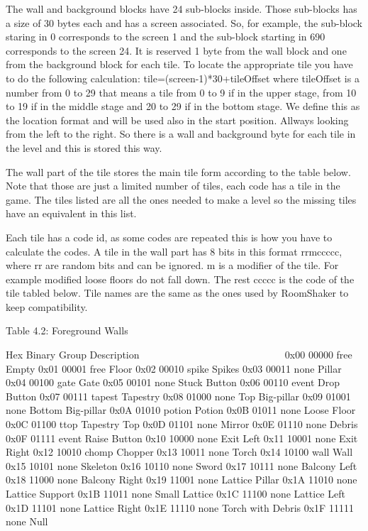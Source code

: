  The wall and background blocks have 24 sub-blocks inside. Those sub-blocks
 has a size of 30 bytes each and has a screen associated. So, for example,
 the sub-block staring in 0 corresponds to the screen 1 and the sub-block
 starting in 690 corresponds to the screen 24.
 It is reserved 1 byte from the wall block and one from the background
 block for each tile. To locate the appropriate tile you have to do the
 following calculation: tile=(screen-1)*30+tileOffset where tileOffset is a
 number
 from 0 to 29 that means a tile from 0 to 9 if in the upper stage, from
 10 to 19 if in the middle stage and 20 to 29 if in the bottom stage.
 We define this as the location format and will be used also in the start
 position.
 Allways looking from the left to the right.
 So there is a wall and background byte for each tile in the level and this
 is stored this way.

 The wall part of the tile stores the main tile form according to the table
 below. Note that those are just a limited number of tiles, each code has a
 tile in the game. The tiles listed are all the ones needed to make a level
 so the missing tiles have an equivalent in this list.

 Each tile has a code id, as some codes are repeated this is how you have
 to calculate the codes. A tile in the wall part has 8 bits in this format
 rrmccccc, where rr are random bits and can be ignored. m is a modifier of
 the tile. For example modified loose floors do not fall down. The rest
 ccccc is the code of the tile tabled below. Tile names are the same as the
 ones used by RoomShaker to keep compatibility.

                   Table 4.2: Foreground Walls
                   ~~~~~~~~~~~~~~~~~~~~~~~~~~~

  Hex  Binary Group  Description
  ~~~~ ~~~~~~ ~~~~~  ~~~~~~~~~~~
  0x00 00000  free   Empty
  0x01 00001  free   Floor
  0x02 00010  spike  Spikes
  0x03 00011  none   Pillar
  0x04 00100  gate   Gate
  0x05 00101  none   Stuck Button
  0x06 00110  event  Drop Button
  0x07 00111  tapest Tapestry
  0x08 01000  none   Top Big-pillar
  0x09 01001  none   Bottom Big-pillar
  0x0A 01010  potion Potion
  0x0B 01011  none   Loose Floor
  0x0C 01100  ttop   Tapestry Top
  0x0D 01101  none   Mirror
  0x0E 01110  none   Debris
  0x0F 01111  event  Raise Button
  0x10 10000  none   Exit Left
  0x11 10001  none   Exit Right
  0x12 10010  chomp  Chopper
  0x13 10011  none   Torch
  0x14 10100  wall   Wall
  0x15 10101  none   Skeleton
  0x16 10110  none   Sword
  0x17 10111  none   Balcony Left
  0x18 11000  none   Balcony Right
  0x19 11001  none   Lattice Pillar
  0x1A 11010  none   Lattice Support
  0x1B 11011  none   Small Lattice
  0x1C 11100  none   Lattice Left
  0x1D 11101  none   Lattice Right
  0x1E 11110  none   Torch with Debris
  0x1F 11111  none   Null

